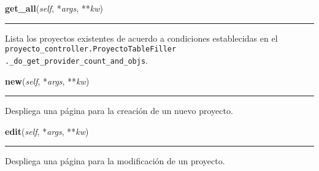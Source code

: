     \vspace{0.5ex}

\hspace{.8\funcindent}\begin{boxedminipage}{\funcwidth}

    \raggedright \textbf{get\_all}(\textit{self}, *\textit{args}, **\textit{kw})

    \vspace{-1.5ex}

    \rule{\textwidth}{0.5\fboxrule}
\setlength{\parskip}{2ex}
    Lista los proyectos existentes de acuerdo a condiciones establecidas en
    el \texttt{proyecto\_controller.ProyectoTableFiller 
    .\_do\_get\_provider\_count\_and\_objs}.

\setlength{\parskip}{1ex}
    \end{boxedminipage}

    \label{saip:controllers:proyecto_controller:ProyectoController:new}

    \vspace{0.5ex}

\hspace{.8\funcindent}\begin{boxedminipage}{\funcwidth}

    \raggedright \textbf{new}(\textit{self}, *\textit{args}, **\textit{kw})

    \vspace{-1.5ex}

    \rule{\textwidth}{0.5\fboxrule}
\setlength{\parskip}{2ex}
    Despliega una página para la creación de un nuevo proyecto.

\setlength{\parskip}{1ex}
    \end{boxedminipage}

    \label{saip:controllers:proyecto_controller:ProyectoController:edit}

    \vspace{0.5ex}

\hspace{.8\funcindent}\begin{boxedminipage}{\funcwidth}

    \raggedright \textbf{edit}(\textit{self}, *\textit{args}, **\textit{kw})

    \vspace{-1.5ex}

    \rule{\textwidth}{0.5\fboxrule}
\setlength{\parskip}{2ex}
    Despliega una página para la modificación de un proyecto.

\setlength{\parskip}{1ex}
    \end{boxedminipage}


